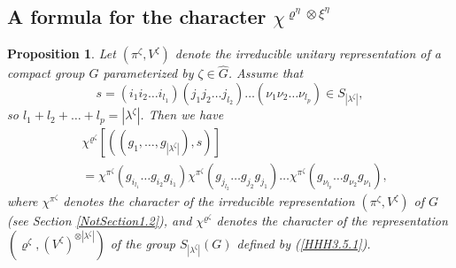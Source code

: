 \documentclass[12pt]{amsart}
\newtheorem{prop}[thm]{Proposition}
\theoremstyle{definition}
\numberwithin{equation}{section}
\begin{document}
\subsection{A formula for the character  $\chi^{\varrho^{\eta}\otimes\xi^{\eta}}$}
\begin{prop}\label{chchiProposition5.1.5}
Let $\left(\pi^{\zeta},V^{\zeta}\right)$ denote the irreducible unitary representation of
a compact group $G$ parameterized by $\zeta\in\widehat{G}$. Assume that
\begin{equation}\label{chchi5.1.2}
s=\left(i_1i_2\ldots i_{l_1}\right)\left(j_1j_2\ldots j_{l_2}\right)\ldots\left(\nu_1\nu_2\ldots\nu_{l_p}\right)\in S_{|\lambda^{\zeta}|},
\end{equation}
so $l_1+l_2+\ldots+l_p=|\lambda^{\zeta}|$.
Then we have
\begin{equation}\label{chchi5.1.3}
\begin{split}
&\chi^{\varrho^{\zeta}}\left[\left((g_1,\ldots,g_{|\lambda^{\zeta}|}),s\right)\right]\\
&=\chi^{\pi^{\zeta}}\left(g_{i_{l_1}}\ldots g_{i_2}g_{i_1}\right)
\chi^{\pi^{\zeta}}\left(g_{j_{l_2}}\ldots g_{j_2}g_{j_1}\right)
\ldots \chi^{\pi^{\zeta}}\left(g_{\nu_{l_p}}\ldots g_{\nu_2}g_{\nu_1}\right),
\end{split}
\end{equation}
where $\chi^{\pi^{\zeta}}$ denotes the character of the irreducible representation $\left(\pi^{\zeta},V^{\zeta}\right)$
of $G$ (see Section \ref{NotSection1.2}),
and $\chi^{\varrho^{\zeta}}$ denotes the character of the representation
$\left(\varrho^{\zeta},\left(V^{\zeta}\right)^{\otimes |\lambda^{\zeta}|}\right)$ of the group
$S_{|\lambda^{\zeta}|}(G)$ defined by (\ref{HHH3.5.1}).
\end{prop}
\end{document}
